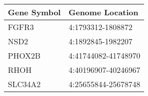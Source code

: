 \begin{tabular}{ll}
\toprule
Gene Symbol &     Genome Location \\
\midrule
      FGFR3 &   4:1793312-1808872 \\
       NSD2 &   4:1892845-1982207 \\
     PHOX2B & 4:41744082-41748970 \\
       RHOH & 4:40196907-40246967 \\
    SLC34A2 & 4:25655844-25678748 \\
\bottomrule
\end{tabular}
